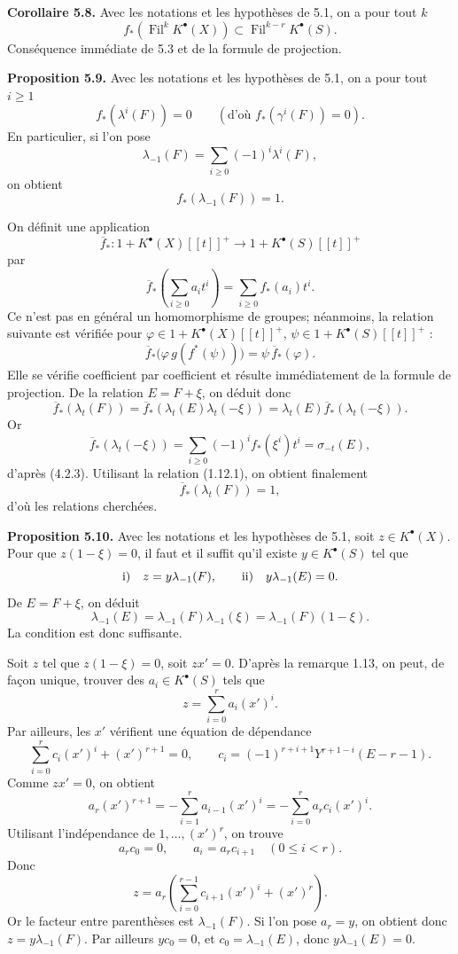 \documentclass[11pt]{article}
\newcommand{\Fil}{\operatorname{Fil}}
\begin{document}
\textbf{Corollaire 5.8.} Avec les notations et les hypothèses de 5.1, on a pour tout \(k\)
\[
  f_*(\Fil^kK^\bullet(X))\subset \Fil^{k-r}K^\bullet(S).
\]
Conséquence immédiate de 5.3 et de la formule de projection.

\textbf{Proposition 5.9.} Avec les notations et les hypothèses de 5.1, on a pour tout \(i\geq1\)
\[
  f_*(\lambda^i(F))=0
  \qquad(\text{d'où }f_*(\gamma^i(F))=0).
\]
En particulier, si l'on pose
\[
  \lambda_{-1}(F)=\sum_{i\geq0}(-1)^i\lambda^i(F),
\]
on obtient
\[
  f_*(\lambda_{-1}(F))=1.
\]

On définit une application
\[
  \overline f_*:1+K^\bullet(X)[[t]]^+
  \longrightarrow 1+K^\bullet(S)[[t]]^+
\]
par
\[
  \overline f_*\left(\sum_{i\geq0}a_it^i\right)
  =
  \sum_{i\geq0}f_*(a_i)t^i.
\]
Ce n'est pas en général un homomorphisme de groupes; néanmoins, la relation suivante est vérifiée pour \(\varphi\in1+K^\bullet(X)[[t]]^+\), \(\psi\in1+K^\bullet(S)[[t]]^+\) :
\[
  \overline f_*\bigl(\varphi\, g(f^*(\psi))\bigr)
  =
  \psi\,\overline f_*(\varphi).
\]
Elle se vérifie coefficient par coefficient et résulte immédiatement de la formule de projection. De la relation \(E=F+\xi\), on déduit donc
\[
  \overline f_*(\lambda_t(F))
  =
  \overline f_*(\lambda_t(E)\lambda_t(-\xi))
  =
  \lambda_t(E)\overline f_*(\lambda_t(-\xi)).
\]
Or
\[
  \overline f_*(\lambda_t(-\xi))
  =
  \sum_{i\geq0}(-1)^if_*(\xi^i)t^i
  =
  \sigma_{-t}(E),
\]
d'après (4.2.3). Utilisant la relation (1.12.1), on obtient finalement
\[
  \overline f_*(\lambda_t(F))=1,
\]
d'où les relations cherchées.

\textbf{Proposition 5.10.} Avec les notations et les hypothèses de 5.1, soit \(z\in K^\bullet(X)\). Pour que \(z(1-\xi)=0\), il faut et il suffit qu'il existe \(y\in K^\bullet(S)\) tel que
\[
  \text{\rm i)}\quad z=y\lambda_{-1}(F),
  \qquad
  \text{\rm ii)}\quad y\lambda_{-1}(E)=0.
\]
De \(E=F+\xi\), on déduit
\[
  \lambda_{-1}(E)=\lambda_{-1}(F)\lambda_{-1}(\xi)
  =
  \lambda_{-1}(F)(1-\xi).
\]
La condition est donc suffisante.

Soit \(z\) tel que \(z(1-\xi)=0\), soit \(zx'=0\). D'après la remarque 1.13, on peut, de façon unique, trouver des \(a_i\in K^\bullet(S)\) tels que
\[
  z=\sum_{i=0}^{r}a_i(x')^i.
\]
Par ailleurs, les \(x'\) vérifient une équation de dépendance
\[
  \sum_{i=0}^{r}c_i(x')^i+(x')^{r+1}=0,
\qquad
  c_i=(-1)^{r+i+1}Y^{r+1-i}(E-r-1).
\]
Comme \(zx'=0\), on obtient
\[
  a_r(x')^{r+1}
  =
  -\sum_{i=1}^{r}a_{i-1}(x')^i
  =
  -\sum_{i=0}^{r}a_rc_i(x')^i.
\]
Utilisant l'indépendance de \(1,\ldots,(x')^r\), on trouve
\[
  a_rc_0=0,\qquad a_i=a_rc_{i+1}\quad(0\leq i<r).
\]
Donc
\[
  z=a_r\left(\sum_{i=0}^{r-1}c_{i+1}(x')^i+(x')^r\right).
\]
Or le facteur entre parenthèses est \(\lambda_{-1}(F)\). Si l'on pose \(a_r=y\), on obtient donc \(z=y\lambda_{-1}(F)\). Par ailleurs \(yc_0=0\), et \(c_0=\lambda_{-1}(E)\), donc \(y\lambda_{-1}(E)=0\).
\end{document}
